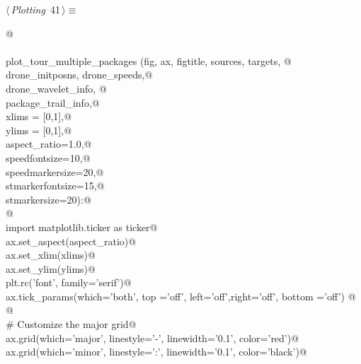 \documentclass[10pt, english, oneside]{report}
\begin{document}
\begin{appendices}
\begin{flushleft} \small
\begin{minipage}{\linewidth}\label{scrap35}\raggedright\small
{} $\langle\,${\itshape Plotting}\nobreak\ {\footnotesize {41}}$\,\rangle\equiv$
\vspace{-1ex}
\begin{list}{}{} \item
\mbox{}\verb@   @\\
\mbox{}\verb@@\\
\mbox{}\verb@def plot_tour_multiple_packages (fig, ax, figtitle, sources, targets, @\\
\mbox{}\verb@          drone_initposns, drone_speeds,@\\
\mbox{}\verb@          drone_wavelet_info, @\\
\mbox{}\verb@          package_trail_info,@\\
\mbox{}\verb@          xlims = [0,1],@\\
\mbox{}\verb@          ylims = [0,1],@\\
\mbox{}\verb@          aspect_ratio=1.0,@\\
\mbox{}\verb@          speedfontsize=10,@\\
\mbox{}\verb@          speedmarkersize=20,@\\
\mbox{}\verb@          stmarkerfontsize=15,@\\
\mbox{}\verb@          stmarkersize=20):@\\
\mbox{}\verb@    @\\
\mbox{}\verb@    import matplotlib.ticker as ticker@\\
\mbox{}\verb@    ax.set_aspect(aspect_ratio)@\\
\mbox{}\verb@    ax.set_xlim(xlims)@\\
\mbox{}\verb@    ax.set_ylim(ylims)@\\
\mbox{}\verb@    plt.rc('font', family='serif')@\\
\mbox{}\verb@    ax.tick_params(which='both', top ='off', left='off',right='off', bottom ='off') @\\
\mbox{}\verb@    @\\
\mbox{}\verb@    # Customize the major grid@\\
\mbox{}\verb@    ax.grid(which='major', linestyle='-', linewidth='0.1', color='red')@\\
\mbox{}\verb@    ax.grid(which='minor', linestyle=':', linewidth='0.1', color='black')@\\
\mbox{}\verb@@\\

\end{list}
\end{minipage}
\end{flushleft}
\end{appendices}
\end{document}
